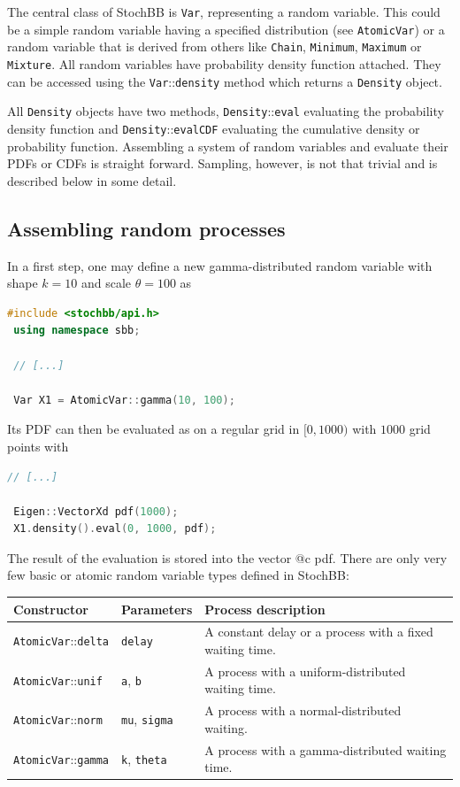 \documentclass[a4paper, 10pt]{paper}
\newcommand{\code}[1]{\texttt{#1}}
\newcommand{\class}[1]{\code{#1}}
\newcommand{\method}[2]{\code{#1}::\code{#2}}
\begin{document}
The central class of StochBB is \class{Var}, representing a random variable. This could be a
simple random variable having a specified distribution (see \class{AtomicVar}) or a random
variable that is derived from others like \class{Chain}, \class{Minimum}, \class{Maximum} or
\class{Mixture}. All random variables have probability density function attached. They can be accessed
using the \method{Var}{density} method which returns a \class{Density} object.

All \class{Density} objects have two methods, \method{Density}{eval} evaluating the probability
density function and \method{Density}{evalCDF} evaluating the cumulative density or probability
function. Assembling a system of random variables and evaluate their PDFs or CDFs is straight
forward. Sampling, however, is not that trivial and is described below in some detail.

\subsection{Assembling random processes}
In a first step, one may define a new gamma-distributed random variable with shape $k=10$
and scale $\theta=100$ as
\begin{lstlisting}[language=C++]
 #include <stochbb/api.h>
 using namespace sbb;
 
 // [...]
 
 Var X1 = AtomicVar::gamma(10, 100);
\end{lstlisting}

Its PDF can then be evaluated as on a regular grid in $[0,1000)$ with $1000$ grid points with
\begin{lstlisting}[language=C++]
 // [...]
 
 Eigen::VectorXd pdf(1000);
 X1.density().eval(0, 1000, pdf);
\end{lstlisting}

The result of the evaluation is stored into the vector @c pdf. There are only very few basic
or atomic random variable types defined in StochBB:

\begin{tabular}{l|l|l}
 Constructor & Parameters & Process description \\ \hline
 \method{AtomicVar}{delta} & \code{delay} & A constant delay or a process with a fixed waiting time. \\
 \method{AtomicVar}{unif} & \code{a}, \code{b} & A process with a uniform-distributed waiting time. \\
 \method{AtomicVar}{norm} & \code{mu}, \code{sigma} & A process with a normal-distributed waiting. \\
 \method{AtomicVar}{gamma} & \code{k}, \code{theta} & A process with a gamma-distributed waiting time. \\
\end{tabular}
\end{document}

